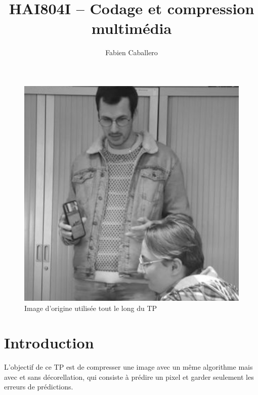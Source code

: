 \documentclass{article}
\title{HAI804I – Codage et compression multimédia
}
\author{Fabien Caballero}
\begin{document}
\maketitle
    \tableofcontents

\newpage

\begin{figure}[h]
\centerline{\includegraphics[scale=0.3]{./rendus/Maribault.png}}
\caption{Image d'origine utilisée tout le long du TP}
\end{figure}

\section*{Introduction}
L'objectif de ce TP est de compresser une image avec un même algorithme mais avec et sans décorellation, qui consiste à prédire un pixel et garder seulement les erreurs de prédictions.
\\\\
\end{document}
